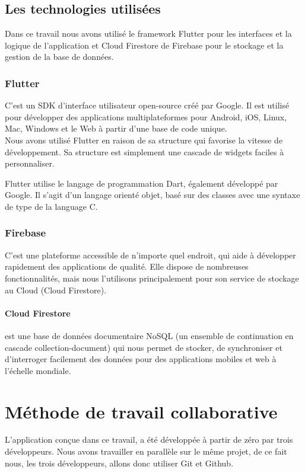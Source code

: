 \documentclass[french, a4paper, 12pt]{report}
\begin{document}
		\subsection{Les technologies utilisées} Dans ce travail nous avons utilisé le framework Flutter pour les interfaces et la logique de l'application et Cloud Firestore de Firebase pour le stockage et la gestion de la base de données.
			\subsubsection*{Flutter} C'est un SDK d'interface utilisateur open-source créé par Google. Il est utilisé pour développer des applications multiplateformes pour Android, iOS, Linux, Mac, Windows et le Web à partir d'une base de code unique.\\Nous avons utilisé Flutter en raison de sa structure qui favorise la vitesse de développement. Sa structure est simplement une cascade de widgets faciles à personnaliser.

Flutter utilise le langage de programmation Dart, également développé par Google. Il s'agit d'un langage orienté objet, basé sur des classes avec une syntaxe de type de la language C.
			\subsubsection*{Firebase} C'est une plateforme accessible de n'importe quel endroit, qui aide à développer rapidement des applications de qualité. Elle dispose de nombreuses fonctionnalités, mais nous l'utilisons principalement pour son service de stockage au Cloud (Cloud Firestore).\\
				\paragraph*{Cloud Firestore} est une base de données documentaire NoSQL (un ensemble de continuation en cascade collection-document) qui nous permet de stocker, de synchroniser et d'interroger facilement des données pour des applications mobiles et web à l'échelle mondiale.
	\section{Méthode de travail collaborative}
		L'application conçue dans ce travail, a été développée à partir de zéro par trois développeurs. Nous avons travailler en parallèle sur le même projet, de ce fait nous, les trois développeurs, allons donc utiliser Git et Github.
\end{document}
